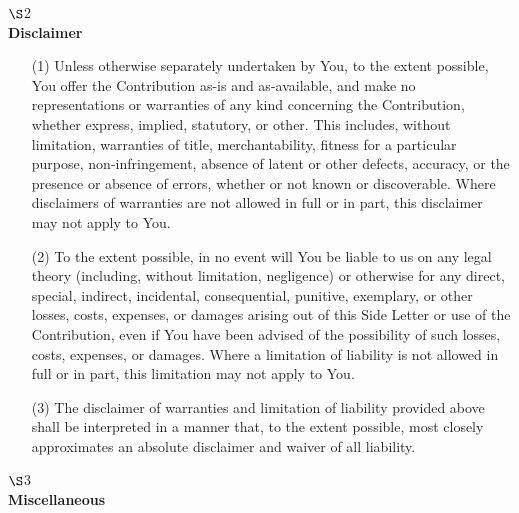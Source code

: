 \begin{center}
$\S$2\\\bfseries
Disclaimer
\end{center}
\begin{itemize}
\item[(1)] Unless otherwise separately undertaken by You, to the extent possible, You offer the Contribution as-is and as-available, and make no representations or warranties of any kind concerning the Contribution, whether express, implied, statutory, or other. This includes, without limitation, warranties of title, merchantability, fitness for a particular purpose, non-infringement, absence of latent or other defects, accuracy, or the presence or absence of errors, whether or not known or discoverable. Where disclaimers of warranties are not allowed in full or in part, this disclaimer may not apply to You.
\item[(2)] To the extent possible, in no event will You be liable to us on any legal theory (including, without limitation, negligence) or otherwise for any direct, special, indirect, incidental, consequential, punitive, exemplary, or other losses, costs, expenses, or damages arising out of this Side Letter or use of the Contribution, even if You have been advised of the possibility of such losses, costs, expenses, or damages. Where a limitation of liability is not allowed in full or in part, this limitation may not apply to You.
\item[(3)] The disclaimer of warranties and limitation of liability provided above shall be interpreted in a manner that, to the extent possible, most closely approximates an absolute disclaimer and waiver of all liability.
\end{itemize}

\begin{center}
$\S$3\\\bfseries
Miscellaneous
\end{center}


